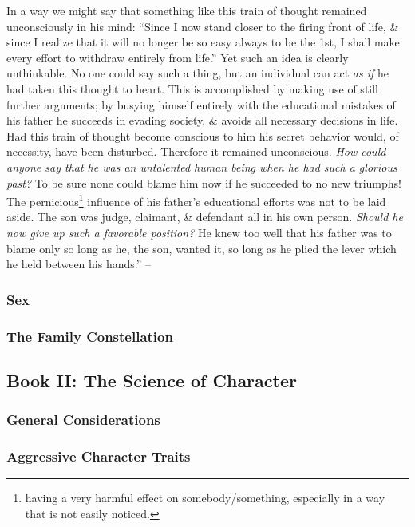 \documentclass{article}
\begin{document}
In a way we might say that something like this train of thought remained unconsciously in his mind: ``Since I now stand closer to the firing front of life, \& since I realize that it will no longer be so easy always to be the 1st, I shall make every effort to withdraw entirely from life.'' Yet such an idea is clearly unthinkable. No one could say such a thing, but an individual can act {\it as if} he had taken this thought to heart. This is accomplished by making use of still further arguments; by busying himself entirely with the educational mistakes of his father he succeeds in evading society, \& avoids all necessary decisions in life. Had this train of thought become conscious to him his secret behavior would, of necessity, have been disturbed. Therefore it remained unconscious. {\it How could anyone say that he was an untalented human being when he had such a glorious past?} To be sure none could blame him now if he succeeded to no new triumphs! The pernicious\footnote{having a very harmful effect on somebody/something, especially in a way that is not easily noticed.} influence of his father's educational efforts was not to be laid aside. The son was judge, claimant, \& defendant all in his own person. {\it Should he now give up such a favorable position?} He knew too well that his father was to blame only so long as he, the son, wanted it, so long as he plied the lever which he held between his hands.'' -- \cite[pp. 97--107]{Adler_human_nature}

\subsubsection{Sex}

\subsubsection{The Family Constellation}

\subsection{Book II: The Science of Character}

\subsubsection{General Considerations}

\subsubsection{Aggressive Character Traits}
\end{document}
